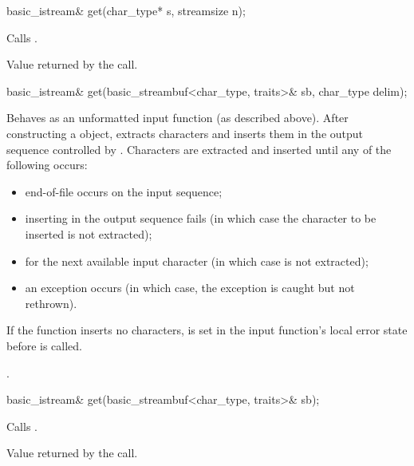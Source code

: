 %
\begin{itemdecl}
basic_istream& get(char_type* s, streamsize n);
\end{itemdecl}

\begin{itemdescr}
\pnum
\effects
Calls
.

\pnum
\returns
Value returned by the call.
\end{itemdescr}

%
\begin{itemdecl}
basic_istream& get(basic_streambuf<char_type, traits>& sb, char_type delim);
\end{itemdecl}

\begin{itemdescr}
\pnum
\effects
Behaves as an unformatted input function
(as described above).
After constructing a  object, extracts
characters and inserts them
in the output sequence controlled by
.
Characters are extracted and inserted until any of the following occurs:
\begin{itemize}
\item
end-of-file occurs on the input sequence;
\item
inserting in the output sequence fails
(in which case the character to be inserted is not extracted);
\item
{} for the next available input
character 
(in which case  is not extracted);
\item
an exception occurs
(in which case, the exception is caught but not rethrown).
\end{itemize}

\pnum
If the function inserts no characters,
 is set in the input function's local error state
before  is called.

\pnum
\returns
{}.
\end{itemdescr}

%
\begin{itemdecl}
basic_istream& get(basic_streambuf<char_type, traits>& sb);
\end{itemdecl}

\begin{itemdescr}
\pnum
\effects
Calls
.

\pnum
\returns
Value returned by the call.
\end{itemdescr}

